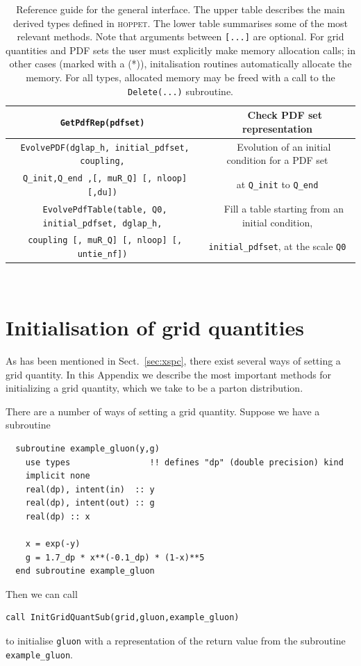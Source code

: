 \documentclass[12pt]{article}
\newcommand{\hoppet}{\textsc{hoppet}\xspace}
\newcommand{\ttt}[1]{\texttt{#1}}
\begin{document}
\begin{table}
\begin{center}
\begin{tabular}{|c|c|}
\hline
\texttt{
GetPdfRep(pdfset)
} & ~~
Check PDF set representation \\
\hline
\texttt{
 EvolvePDF(dglap\_h, initial\_pdfset, coupling,}
 & ~~
Evolution of an initial condition for a PDF set \\
\texttt{ Q\_init,Q\_end ,[, muR\_Q] [, nloop] [,du])} 
& at {\tt Q\_init} to  {\tt Q\_end} \\
\hline
\texttt{
 EvolvePdfTable(table, Q0, initial\_pdfset, dglap\_h,} 
 & ~~ 
Fill a table starting from an initial condition,\\
\texttt{ coupling  [, muR\_Q] [, nloop] [, untie\_nf])} 
& \ttt{initial\_pdfset}, at the scale {\tt Q0} \\ 
\hline
\end{tabular} \\
\end{center}
\caption{\label{tab:general}
Reference guide for the general interface.
The upper table describes the main
derived types defined in \hoppet.
%
The lower table summarises some of the most relevant methods. Note that arguments
between \texttt{[...]} are optional. For grid quantities and PDF sets
the user must explicitly make memory allocation calls; in other cases
(marked with a (*)), initalisation routines automatically
allocate the memory. For all types, allocated memory may be freed with
a call to the \ttt{Delete(...)} subroutine. }
\end{table}




\section{Initialisation of grid quantities}
\label{sec:gridinit}
As has been mentioned in
Sect.~\ref{sec:xspc},  
there exist several ways of setting a grid quantity. In this
Appendix we describe the most important methods for initializing
a grid quantity, which we take to be a parton distribution.

There are a number of ways of setting a grid quantity. Suppose we have
a subroutine
\begin{lstlisting}
  subroutine example_gluon(y,g)
    use types                !! defines "dp" (double precision) kind
    implicit none
    real(dp), intent(in)  :: y
    real(dp), intent(out) :: g
    real(dp) :: x
    
    x = exp(-y)
    g = 1.7_dp * x**(-0.1_dp) * (1-x)**5 
  end subroutine example_gluon
\end{lstlisting}
Then we can call
\begin{lstlisting}
call InitGridQuantSub(grid,gluon,example_gluon)
\end{lstlisting}
to initialise \texttt{gluon} with a representation of the return value
from the subroutine \texttt{example\_gluon}.
\end{document}
